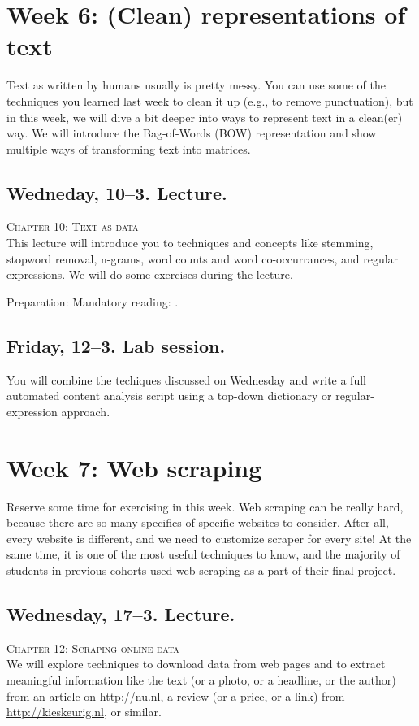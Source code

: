 \section*{Week 6: (Clean) representations of text}
Text as written by humans usually is pretty messy. You can use some of the techniques you learned last week to clean it up (e.g., to remove punctuation), but in this week, we will dive a bit deeper into ways to represent text in a clean(er) way. We will introduce the Bag-of-Words (BOW) representation and show multiple ways of transforming text into matrices.



\subsection*{Wedneday, 10--3. Lecture.}
\textsc{ Chapter 10: Text as data}\\
This lecture will introduce you to techniques and concepts like stemming, stopword removal, n-grams, word counts and word co-occurrances, and regular expressions. We will do some exercises during the lecture.

Preparation: Mandatory reading: \cite{Boumans2016}.


\subsection*{Friday, 12--3. Lab session.}
You will combine the techiques discussed on Wednesday and write a full automated content analysis script using a top-down dictionary or regular-expression approach.





\section*{Week 7: Web scraping}
Reserve some time for exercising in this week. Web scraping can be really hard, because there are so many specifics of specific websites to consider. After all, every website is different, and we need to customize scraper for every site! At the same time, it is one of the most useful techniques to know, and the majority of students in previous cohorts used web scraping as a part of their final project.

\subsection*{Wednesday, 17--3. Lecture.}
\textsc{ Chapter 12: Scraping online data}\\
We will explore techniques to download data from web pages and to extract meaningful information like the text (or a photo, or a headline, or the author) from an article on \url{http://nu.nl}, a review (or a price, or a link) from \url{http://kieskeurig.nl}, or similar.

